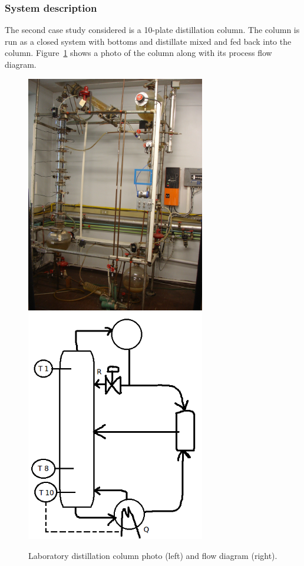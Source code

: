 \subsubsection{System description}
The second case study considered is a 10-plate distillation column.
The column is run as a closed system with bottoms and distillate mixed and fed back into the column.
Figure~\ref{fig:columnphoto} shows a photo of the column along with its process flow diagram.
\begin{figure}[htbp]
  \centering
    \includegraphics[width=7.8cm]{graph/columnphoto.jpg}
    \includegraphics[width=7.8cm]{graph/columnpfd}
  \caption[Laboratory distillation column photo and flow diagram]{Laboratory distillation column photo (left) and flow diagram (right).}
  \label{fig:columnphoto}
\end{figure}

